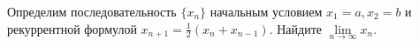 \documentclass{article}
\begin{document}
Определим последовательность $\{x_n\}$ начальным условием $x_1=a, x_2=b$ и рекуррентной формулой $x_{n+1} = \frac12 (x_n + x_{n-1})$. 
Найдите $\lim\limits_{n\to \infty} x_n$.
\end{document}
